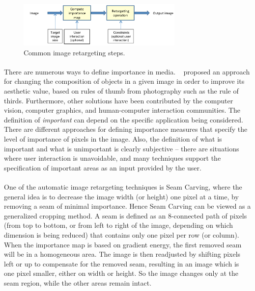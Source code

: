 \documentclass[conference]{acmsiggraph}
\begin{document}
\begin{figure}[ht]
  \centering
  \includegraphics[width=3.2in]{images/retargeting}
  \caption{Common image retargeting steps.}
\end{figure}

\paragraph{}
There are numerous ways to define importance in media. ~\cite{Liu2010} proposed an approach for changing the composition of objects in a given image in order to improve its aesthetic value, based on rules of thumb from photography such as the rule of thirds. Furthermore, other solutions have been contributed by the computer vision, computer graphics, and human-computer interaction
communities. The definition of \emph{important} can depend on the specific application being considered. There are different approaches for defining importance measures that specify the level of importance of pixels in the image. Also, the definition of what is important and what is unimportant is clearly subjective -- there are situations where user interaction is unavoidable, and many techniques support the specification of important areas as an input provided by the user.


\paragraph{}
One of the automatic image retargeting techniques is Seam Carving, where the general idea is to decrease the image width (or height) one pixel at a time, by removing a seam of minimal importance. Hence Seam Carving can be viewed as a generalized cropping method. A seam is defined as an 8-connected path of pixels (from top to bottom, or from left to right of the image, depending on which dimension is being reduced) that contains only one pixel per row (or column). When the importance map is based on gradient energy, the first removed seam will be in a homogeneous area. The image is then readjusted by shifting pixels left or up to compensate for the removed seam, resulting in an image which is one pixel smaller, either on width or height. So the image changes only at the seam region, while the other areas remain intact. 
\end{document}
